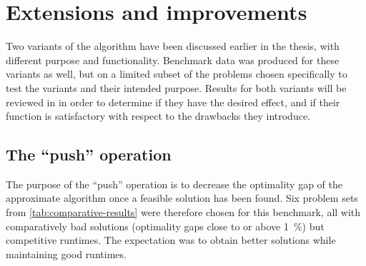 \section{Extensions and improvements}
Two variants of the algorithm have been discussed earlier in the thesis, with different purpose and functionality.
Benchmark data was produced for these variants as well, but on a limited subset of the problems chosen specifically to test the variants and their intended purpose.
Results for both variants will be reviewed in in order to determine if they have the desired effect, and if their function is satisfactory with respect to the drawbacks they introduce.

\subsection{The \enquote{push} operation}
The purpose of the \enquote{push} operation is to decrease the optimality gap of the approximate algorithm once a feasible solution has been found.
Six problem sets from \cref{tab:comparative-results} were therefore chosen for this benchmark, all with comparatively bad solutions (optimality gaps close to or above \SI{1}{\percent}) but competitive runtimes.
The expectation was to obtain better solutions while maintaining good runtimes.

